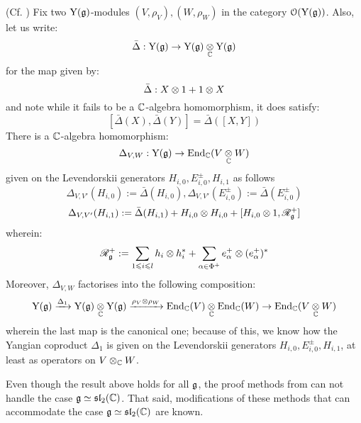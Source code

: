             \begin{proposition} \label{prop: yangian_hopf_structure_via_levendorskii_presentation}
                (Cf. \cite[Definition 4.6, Theorem 4.9, and Proposition 5.18]{guay_nakajima_wendlandt_affine_yangian_coproduct}) Fix two $\mathrm{Y}(\mathfrak{g})$-modules $(V, \rho_V), (W, \rho_W)$ in the category $\mathcal{O}(\mathrm{Y}(\mathfrak{g}))$. Also, let us write:
                    $$\bar{\Delta}: \rmY(\g) \to \rmY(\g) \tensor_{\bbC} \rmY(\g)$$
                for the map given by:
                    $$\bar{\Delta}: X \tensor 1 + 1 \tensor X$$
                and note while it fails to be a $\mathbb{C}$-algebra homomorphism, it does satisfy:
                    $$[ \bar{\Delta}(X), \bar{\Delta}(Y) ] = \bar{\Delta}( [X, Y] )$$
                There is a $\mathbb{C}$-algebra homomorphism:
                    $$\Delta_{V, W}: \rmY(\g) \to \End_{\bbC}(V \tensor_{\bbC} W)$$
                given on the Levendorskii generators $H_{i, 0}, E_{i, 0}^{\pm}, H_{i, 1}$ as follows
                    $$\Delta_{V, V'}(H_{i, 0}) := \bar{\Delta}(H_{i, 0}), \Delta_{V, V'}(E_{i, 0}^{\pm}) := \bar{\Delta}(E_{i, 0}^{\pm})$$
                    $$\Delta_{V, V'}(H_{i, 1}) := \bar{\Delta}(H_{i, 1}) + H_{i, 0} \tensor H_{i, 0} + [H_{i, 0} \tensor 1, \scrR_{\g}^+]$$
                wherein:
                    $$\scrR_{\g}^+ := \sum_{1 \leq i \leq l} h_i \tensor h_i^* + \sum_{\alpha \in \Phi^+} e_{\alpha}^+ \tensor ( e_{\alpha}^+ )^*$$
                Moreover, $\Delta_{V, W}$ factorises into the following composition:
                    $$\rmY(\g) \xrightarrow[]{\Delta_1} \rmY(\g) \tensor_{\bbC} \rmY(\g) \xrightarrow[]{\rho_V \tensor \rho_W} \End_{\bbC}(V) \tensor_{\bbC} \End_{\bbC}(W) \to \End_{\bbC}(V \tensor_{\bbC} W)$$
                wherein the last map is the canonical one; because of this, we know how the Yangian coproduct $\Delta_1$ is given on the Levendorskii generators $H_{i, 0}, E_{i, 0}^{\pm}, H_{i, 1}$, at least as operators on $V \tensor_{\bbC} W$. 
            \end{proposition}
            \begin{remark}
                Even though the result above holds for all $\mathfrak{g}$, the proof methods from \cite[Theorem 4.9]{guay_nakajima_wendlandt_affine_yangian_coproduct} can not handle the case $\mathfrak{g} \simeq \mathfrak{sl}_2(\mathbb{C})$. That said, modifications of these methods that can accommodate the case $\mathfrak{g} \simeq \mathfrak{sl}_2(\mathbb{C})$ are known. 
            \end{remark}

